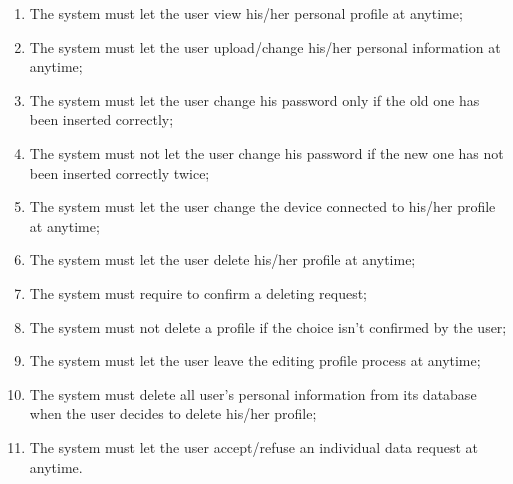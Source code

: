 \begin{enumerate}
  \item The system must let the user view his/her personal profile at anytime;
  \item The system must let the user upload/change his/her personal information at anytime;
  \item The system must let the user change his password only if the old one has been inserted correctly;
  \item The system must not let the user change his password if the new one has not been inserted correctly twice;
  \item The system must let the user change the device connected to his/her profile at anytime;
  \item The system must let the user delete his/her profile at anytime;
  \item The system must require to confirm a deleting request;
  \item The system must not delete a profile if the choice isn't confirmed by the user;
  \item The system must let the user leave the editing profile process at anytime;
  \item The system must delete all user's personal information from its database when the user decides to delete his/her profile;
  \item The system must let the user accept/refuse an individual data request at anytime.
\end{enumerate}

